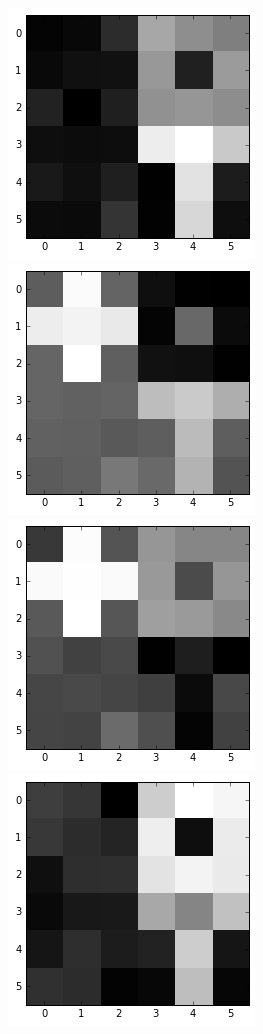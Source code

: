 \documentclass{article}
\begin{document}
\begin{figure}[ht]
\vskip 0.2in
\begin{center}
\includegraphics[scale=0.3]{b1}
\includegraphics[scale=0.3]{b2}
\includegraphics[scale=0.3]{b3}
\includegraphics[scale=0.3]{b4}

\end{center}
\end{figure}
\end{document}
